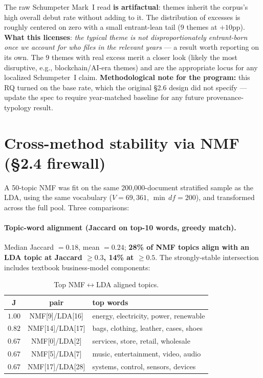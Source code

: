 \documentclass[11pt]{report}
\begin{document}
\noindent The raw Schumpeter Mark~I read \textbf{is artifactual}: themes
inherit the corpus's high overall debut rate without adding to it. The
distribution of excesses is roughly centered on zero with a small entrant-lean
tail (9 themes at $+10$pp). \textbf{What this licenses}: \emph{the typical
theme is not disproportionately entrant-born once we account for who files in
the relevant years} --- a result worth reporting on its own. The 9 themes with
real excess merit a closer look (likely the most disruptive, e.g.,
blockchain/AI-era themes) and are the appropriate locus for any localized
Schumpeter~I claim. \textbf{Methodological note for the program:} this RQ
turned on the base rate, which the original §2.6 design did not specify ---
update the spec to require year-matched baseline for any future
provenance-typology result.

\section{Cross-method stability via NMF (§2.4 firewall)}
A 50-topic NMF was fit on the same 200{,}000-document stratified sample as the
LDA, using the same vocabulary ($V = 69{,}361$, $\min\,df = 200$), and
transformed across the full pool. Three comparisons:

\paragraph{Topic-word alignment (Jaccard on top-10 words, greedy match).}
Median Jaccard $= 0.18$, mean $= 0.24$; \textbf{28\% of NMF topics align with
an LDA topic at Jaccard $\geq 0.3$, 14\% at $\geq 0.5$}. The strongly-stable
intersection includes textbook business-model components:

\begin{table}[h]\centering\small
\caption{Top NMF$\leftrightarrow$LDA aligned topics.}
\begin{tabular}{ccp{}}
\toprule
J & pair & top words \\
\midrule
$1.00$ & NMF[9]/LDA[16] & energy, electricity, power, renewable \\
$0.82$ & NMF[14]/LDA[17]& bags, clothing, leather, cases, shoes \\
$0.67$ & NMF[0]/LDA[2]  & services, store, retail, wholesale \\
$0.67$ & NMF[5]/LDA[7]  & music, entertainment, video, audio \\
$0.67$ & NMF[17]/LDA[28]& systems, control, sensors, devices \\
\bottomrule
\end{tabular}
\end{table}
\end{document}
